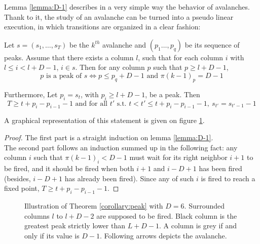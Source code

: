 \documentclass[11pt,a4paper]{llncs}
\begin{document}
Lemma \ref{lemma:D-1} describes in a very simple way the behavior of avalanches. Thank to it, the study of an avalanche can be turned into a pseudo linear execution, in which transitions are organized in a clear fashion:




\begin{theorem}\label{corollary:peak}
  Let $s=(s_1,\dots,s_T)$ be the $k^{th}$ avalanche and $(p_1\dots,p_q)$ be its sequence of peaks. Assume that  there exists a column $l$,  such that for each column  $i$ with $l \leq i < l+D-1$, $i \in s$. 
  Then for any column $p$ such that $p \geq l+D-1$, 
  $$p\text{ is a peak of }  s  \iff  p \leq p_q +D-1\text{ and }\pi(k-1)_p = D-1$$
  
  Furthermore, Let $p_i=s_t$, with $p_i \geq l+D-1$, be a peak. Then
  $$T \geq t+p_i-p_{i-1}-1 \text{ and for all } t' \text{ s.t. } t < t' \leq t+p_i-p_{i-1}-1,~ s_{t'}=s_{t'-1}-1$$

 \end{theorem}

 A graphical representation of this statement is given on figure \ref{fig:peak}.

\begin{proof}
  The first part  is a straight induction on lemma \ref{lemma:D-1}.\\
  The second part follows an induction summed up in the following fact: any column $i$ such that $\pi(k-1)_i < D-1$ must wait for its right neighbor $i+1$ to be fired, and it should be fired when both $i+1$ and $i-D+1$ has been fired (besides, $i-D+1$ has already been fired). Since any of such $i$ is fired to reach a fixed point, $T \geq t+p_i - p_{i-1} -1$.
\end{proof}

\begin{figure}
\caption{Illustration of Theorem \ref{corollary:peak} with $D=6$. Surrounded columns $l$ to $l+D-2$ are supposed to be fired. Black column is the greatest peak strictly lower than $L+D-1$. A column is grey if and only if its value is $D-1$. Following arrows depicts the avalanche.}
\label{fig:peak}
\end{figure}
\end{document}

